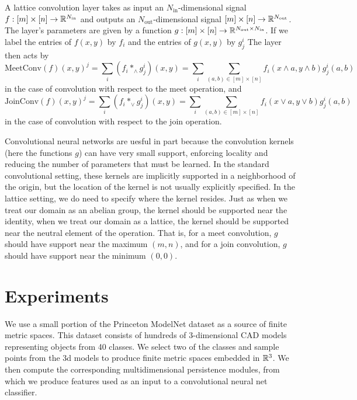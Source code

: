 \documentclass{article}
\begin{document}
A lattice convolution layer takes as input an $N_{\text{in}}$-dimensional signal
$f : [m] \times [n] \to \mathbb{R}^{N_{\text{in}}}$ and outputs an
$N_{\text{out}}$-dimensional signal $ [m] \times [n] \to
\mathbb{R}^{N_{\text{out}}}$. The layer's parameters are given by a function $g: [m]
\times [n] \to \mathbb{R}^{N_{\text{out}}\times N_{\text{in}}}$. If we label the
entries of $f(x,y)$ by $f_i$ and the entries of $g(x,y)$ by $g^i_j$ The layer then acts by
\[\text{MeetConv}(f)(x,y)^j = \sum_{i} (f_i \ast_{\wedge} g^i_j)(x,y) = \sum_i
  \sum_{(a,b) \in [m]\times [n]} f_i(x \wedge a, y \wedge b)g^i_j(a,b)\]
in the case of convolution with respect to the meet operation, and
\[\text{JoinConv}(f)(x,y)^j = \sum_{i} (f_i \ast_{\vee} g^i_j)(x,y) = \sum_i
  \sum_{(a,b) \in [m]\times [n]} f_i(x \vee a, y \vee b)g^i_j(a,b)\]
in the case of convolution with respect to the join operation.

Convolutional neural networks are uesful in part because the convolution kernels
(here the functions $g$) can have very small support, enforcing locality and
reducing the number of parameters that must be learned. In the standard
convolutional setting, these kernels are implicitly supported in a neighborhood
of the origin, but the location of the kernel is not usually explicitly
specified. In the lattice setting, we do need to specify where the kernel
resides. Just as when we treat our domain as an abelian group, the kernel should
be supported near the identity, when we treat our domain as a lattice, the
kernel should be supported near the neutral element of the operation. That is,
for a meet convolution, $g$ should have support near the maximum $(m,n)$, and
for a join convolution, $g$ should have support near the minimum $(0,0)$.







\section{Experiments}
We use a small portion of the Princeton ModelNet dataset as a source of finite
metric spaces. This dataset consists of hundreds of 3-dimensional CAD models
representing objects from 40 classes. We select two of the classes and sample
points from the 3d models to produce finite metric spaces embedded in $\mathbb{R}^3$.
We then compute the corresponding multidimensional persistence modules, from
which we produce features used as an input to a convolutional neural net
classifier.
\end{document}
